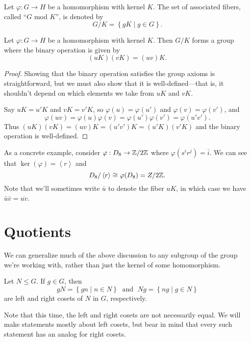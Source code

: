 \documentclass[../m171main.tex]{subfiles}
\begin{document}
\begin{definition}[]
    Let $\varphi : G \to H$ be a homomorphism with kernel $K$.
    The set of associated fibers, called ``$G$ mod $K$'', is denoted by
    \[ G / K = \left\{ gK \mid g \in G \right\}. \]
\end{definition}

\begin{theorem}[]
    Let $\varphi : G \to H$ be a homomorphism with kernel $K$.
    Then $G / K$ forms a group where the binary operation is given by
    \[ (uK)(vK) = (uv)K. \]
\end{theorem}

\begin{proof}
    Showing that the binary operation satisfies the group axioms is straightforward, but we must also show that it is well-defined---that is, it shouldn't depend on which elements we take from $uK$ and $vK$.

    Say $uK = u'K$ and $vK = v'K$, so $\varphi(u) = \varphi(u')$ and $\varphi(v) = \varphi(v')$, and
    \[ \varphi(uv) = \varphi(u) \varphi(v) = \varphi(u') \varphi(v') = \varphi(u'v'). \]
    Thus $(uK)(vK) = (uv)K = (u'v')K = (u'K)(v'K)$ and the binary operation is well-defined.
\end{proof}

As a concrete example, consider $\varphi : D_8 \to \mathbb{Z} / 2\mathbb{Z}$ where $\varphi(s^{i} r^{j}) = \bar i$.
We can see that $\ker(\varphi) = \left< r \right>$ and
\[ D_8 / \left< r \right> \cong \varphi(D_8) = Z / 2\mathbb{Z}. \]
Note that we'll sometimes write $\bar u$ to denote the fiber $uK$, in which case we have $\bar u \bar v = \overline{uv}$.

\section{Quotients}
We can generalize much of the above discussion to any subgroup of the group we're working with, rather than just the kernel of some homomorphism.

\begin{definition}[Coset]
    Let $N \leq G$.
    If $g \in G$, then
    \[ gN = \left\{ gn \mid n \in N \right\} \;\text{ and }\; Ng = \left\{ ng \mid g \in N \right\} \]
    are left and right cosets of $N$ in $G$, respectively.
\end{definition}

Note that this time, the left and right cosets are not necessarily equal.
We will make statements mostly about left cosets, but bear in mind that every such statement has an analog for right cosets.
\end{document}
